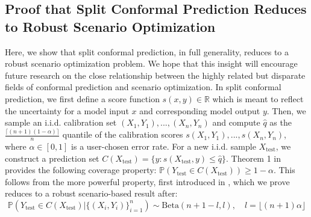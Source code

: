 \subsection{Proof that Split Conformal Prediction Reduces to Robust Scenario Optimization}\label{apd:reduction_proof}
Here, we show that split conformal prediction, in full generality, reduces to a robust scenario optimization problem.
We hope that this insight will encourage future research on the close relationship between the highly related but disparate fields of conformal prediction and scenario optimization.
In split conformal prediction, we first define a score function $s(x,y) \in \mathbb{R}$ which is meant to reflect the uncertainty for a model input $x$ and corresponding model output $y$.
Then, we sample an i.i.d. calibration set $(X_1,Y_1),...,(X_n,Y_n)$ and compute $\hat{q}$ as the $\frac{\lceil(n+1)(1-\alpha)\rceil}{n}$ quantile of the calibration scores $s(X_1,Y_1),...,s(X_n,Y_n)$, where $\alpha \in [0, 1]$ is a user-chosen error rate.
For a new i.i.d. sample $X_\text{test}$, we construct a prediction set $C(X_\text{test})=\{y: s(X_\text{test},y) \le \hat{q}\}$.
Theorem 1 in \citet{MAL-101} provides the following coverage property: $\mathbb{P} \left( Y_{\text{test}} \in C(X_\text{test}) \right) \ge 1-\alpha$.
This follows from the more powerful property, first introduced in \citet{pmlr-v25-vovk12}, which we prove reduces to a robust scenario-based result after:
\begin{equation}\label{eq:conditional_coverage}
    \mathbb{P} \left( Y_\text{test} \in C(X_\text{test}) | \{ (X_i, Y_i) \}^n_{i=1} \right) \sim \text{Beta}(n+1-l, l), \quad l=\lfloor (n+1)\alpha \rfloor
\end{equation}

